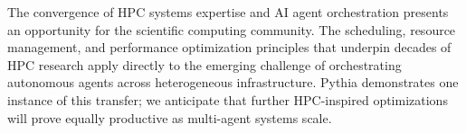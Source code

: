 \documentclass[conference,10pt]{IEEEtran}
\begin{document}
The convergence of HPC systems expertise and AI agent orchestration presents an opportunity for the scientific computing community.
The scheduling, resource management, and performance optimization principles that underpin decades of HPC research apply directly to the emerging challenge of orchestrating autonomous agents across heterogeneous infrastructure.
Pythia demonstrates one instance of this transfer; we anticipate that further HPC-inspired optimizations will prove equally productive as multi-agent systems scale.





\end{document}
